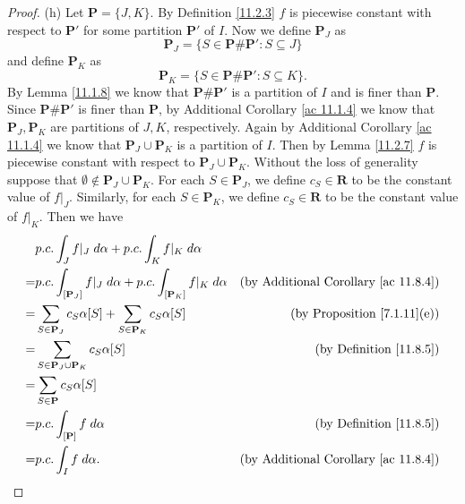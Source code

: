\begin{proof}{(h)}
    Let \(\mathbf{P} = \{J, K\}\).
    By Definition \ref{11.2.3} \(f\) is piecewise constant with respect to \(\mathbf{P}'\) for some partition \(\mathbf{P}'\) of \(I\).
    Now we define \(\mathbf{P}_J\) as
    \[
        \mathbf{P}_J = \{S \in \mathbf{P} \# \mathbf{P}' : S \subseteq J\}
    \]
    and define \(\mathbf{P}_K\) as
    \[
        \mathbf{P}_K = \{S \in \mathbf{P} \# \mathbf{P}' : S \subseteq K\}.
    \]
    By Lemma \ref{11.1.8} we know that \(\mathbf{P} \# \mathbf{P}'\) is a partition of \(I\) and is finer than \(\mathbf{P}\).
    Since \(\mathbf{P} \# \mathbf{P}'\) is finer than \(\mathbf{P}\), by Additional Corollary \ref{ac 11.1.4} we know that \(\mathbf{P}_J, \mathbf{P}_K\) are partitions of \(J, K\), respectively.
    Again by Additional Corollary \ref{ac 11.1.4} we know that \(\mathbf{P}_J \cup \mathbf{P}_K\) is a partition of \(I\).
    Then by Lemma \ref{11.2.7} \(f\) is piecewise constant with respect to \(\mathbf{P}_J \cup \mathbf{P}_K\).
    Without the loss of generality suppose that \(\emptyset \notin \mathbf{P}_J \cup \mathbf{P}_K\).
    For each \(S \in \mathbf{P}_J\), we define \(c_S \in \mathbf{R}\) to be the constant value of \(f|_J\).
    Similarly, for each \(S \in \mathbf{P}_K\), we define \(c_S \in \mathbf{R}\) to be the constant value of \(f|_K\).
    Then we have
    \begin{align*}
          & p.c. \int_J f|_J \; d \alpha + p.c. \int_K f|_K \; d \alpha                                                                                  \\
        = & p.c. \int_{[\mathbf{P}_J]} f|_J \; d \alpha + p.c. \int_{[\mathbf{P}_K]} f|_K \; d \alpha & \text{(by Additional Corollary \ref{ac 11.8.4})} \\
        = & \sum_{S \in \mathbf{P}_J} c_S \alpha[S] + \sum_{S \in \mathbf{P}_K} c_S \alpha[S]         & \text{(by Proposition \ref{7.1.11}(e))}          \\
        = & \sum_{S \in \mathbf{P}_J \cup \mathbf{P}_K} c_S \alpha[S]                                 & \text{(by Definition \ref{11.8.5})}              \\
        = & \sum_{S \in \mathbf{P}} c_S \alpha[S]                                                                                                        \\
        = & p.c. \int_{[\mathbf{P}]} f \; d \alpha                                                    & \text{(by Definition \ref{11.8.5})}              \\
        = & p.c. \int_I f \; d \alpha.                                                                & \text{(by Additional Corollary \ref{ac 11.8.4})}
    \end{align*}
\end{proof}

